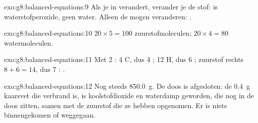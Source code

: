 \begin{solution}{exo:g8:balanced-equations:9}
Als je  in  verandert, verander je de stof: 
is waterstofperoxide, geen water. Alleen de  mogen
veranderen: .
\end{solution}

\begin{solution}{exo:g8:balanced-equations:10}
$20 \times 5 = 100$ zuurstofmoleculen; $20 \times 4 = 80$
watermoleculen.
\end{solution}

\begin{solution}{exo:g8:balanced-equations:11}
Met 2 : 4 C, dus 4 ; 12 H, dus 6 ; zuurstof
rechts $8 + 6 = 14$, dus 7 :
.
\end{solution}

\begin{solution}{exo:g8:balanced-equations:12}
Nog steeds \qty{850.0}{g}. De doos is afgesloten: de \qty{0.4}{g}
kaarsvet die verbrand is, is koolstofdioxide en waterdamp geworden, die
nog in de doos zitten, samen met de zuurstof die ze hebben opgenomen.
Er is niets binnengekomen of weggegaan.
\end{solution}

